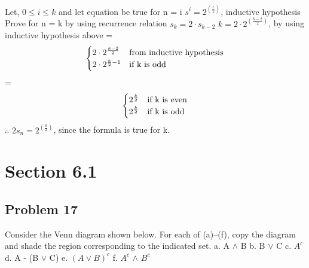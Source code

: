 \documentclass{article}
\begin{document}
	\newline
	Let, $0 \leq i \leq k$ and let equation be true for n = i
	\newline
	$s^{i} = 2^{(\frac{i}{2})}$, inductive hypothesis
	\newline
	Prove for n = k by using recurrence relation $s_{k} = 2 \cdot s_{k-2}$
	\newline
	$k = 2 \cdot 2^{(\frac{k-2}{2})}$, by using inductive hypothesis above
	\newline
	= \[ \begin{cases} 
	2 \cdot 2^{\frac{k-2}{2}} & $from inductive hypothesis$ \\
	2 \cdot 2^{\frac{k}{2} - 1} & $if k is odd$ \\
	\end{cases}
	\]
	\newline
	= \[ \begin{cases} 
	2^{\frac{k}{2}} & $if k is even$ \\
	2^{\frac{k}{2}} & $if k is odd$ \\
	\end{cases}
	\]
	\newline
	$\therefore$ $2s_{n} = 2^{(\frac{k}{2})}$, since the formula is true for k.
	

	\section*{Section 6.1}
	\subsection*{Problem 17}
	Consider the Venn diagram shown below. For each of (a)–(f),
	copy the diagram and shade the region corresponding to the
	indicated set.
	\newline
	a. A $\land$ B
	\newline
	b. B $\lor$ C
	\newline
	c. $A^{c}$
	\newline
	d. A - (B $\lor$ C)
	\newline
	e. $(A \lor B)^{c}$
	\newline
	f. $A^{c}$ $\land$ $B^{c}$
	\newline
	
\end{document}
